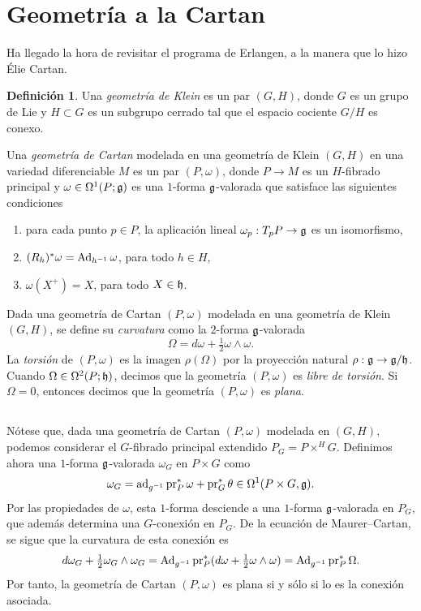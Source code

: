 \documentclass[11pt,a4paper]{amsbook}
\theoremstyle{remark} \newtheorem{rmk}[subsection]{Observación}
\theoremstyle{definition} \newtheorem{defn}[subsection]{Definición}
\theoremstyle{definition} \newtheorem{ex}[subsection]{Ejemplo}
\theoremstyle{definition} \newtheorem{ej}[subsection]{Ejercicio}
\begin{document}
\section{Geometría a la Cartan}
Ha llegado la hora de revisitar el programa de Erlangen, a la manera que lo hizo Élie Cartan.

\begin{defn}
  Una \emph{geometría de Klein} es un par $(G,H)$, donde $G$ es un grupo de Lie y $H\subset G$ es un subgrupo cerrado tal que el espacio cociente $G/H$ es conexo.

  Una \emph{geometría de Cartan} modelada en una geometría de Klein $(G,H)$ en una variedad diferenciable $M$ es un par $(P,\omega)$, donde $P\rightarrow M$ es un $H$-fibrado principal y $\omega \in \Omega^1(P;\mathfrak{g})$ es una $1$-forma $\mathfrak{g}$-valorada que satisface las siguientes condiciones
  \begin{enumerate}
    \item para cada punto $p\in P$, la aplicación lineal $\omega_p:T_p P \rightarrow \mathfrak{g}$ es un isomorfismo,
    \item $(R_h)^*\omega = \operatorname{Ad}_{h^{-1}} \omega$, para todo $h\in H$,
    \item $\omega(X^+)=X$, para todo $X\in \mathfrak h$.
  \end{enumerate}

  Dada una geometría de Cartan $(P,\omega)$ modelada en una geometría de Klein $(G,H)$, se define su \emph{curvatura} como la $2$-forma $\mathfrak{g}$-valorada
  \begin{equation*}
\Omega = d\omega + \tfrac{1}{2} \omega \wedge \omega.
  \end{equation*}
  La \emph{torsión} de $(P,\omega)$ es la imagen $\rho(\Omega)$ por la proyección natural $\rho:\mathfrak{g} \rightarrow \mathfrak{g}/\mathfrak h$. Cuando $\Omega \in \Omega^2(P;\mathfrak h)$, decimos que la geometría $(P,\omega)$ es \emph{libre de torsión}. Si $\Omega=0$, entonces decimos que la geometría $(P,\omega)$ es \emph{plana}.
\end{defn}

\subsection{} Nótese que, dada una geometría de Cartan $(P,\omega)$ modelada en $(G,H)$, podemos considerar el $G$-fibrado principal extendido $P_G=P\times^H G$. Definimos ahora una $1$-forma $\mathfrak{g}$-valorada $\omega_G$ en $P\times G$ como
\begin{equation*}
\omega_G = \operatorname{ad}_{g^{-1}} \operatorname{pr}_P^* \omega + \operatorname{pr}_G^* \theta \in \Omega^1(P\times G, \mathfrak{g}).
\end{equation*}
Por las propiedades de $\omega$, esta $1$-forma desciende a una $1$-forma $\mathfrak{g}$-valorada en $P_G$, que además determina una $G$-conexión en $P_G$. De la ecuación de Maurer--Cartan, se sigue que la curvatura de esta conexión es
\begin{equation*}
d \omega_G + \tfrac{1}{2} \omega_G \wedge \omega_G = \operatorname{Ad}_{g^{-1}} \operatorname{pr}_P^* (d\omega + \tfrac{1}{2}\omega \wedge \omega) = \operatorname{Ad}_{g^{-1}} \operatorname{pr}_P^* \Omega.
\end{equation*}
Por tanto, la geometría de Cartan $(P,\omega)$ es plana si y sólo si lo es la conexión asociada.
\end{document}
